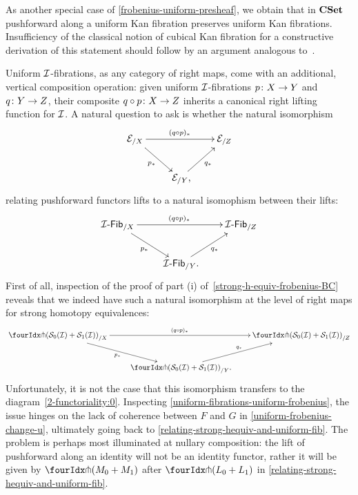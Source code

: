 \documentclass[reqno,10pt,a4paper,oneside,draft]{amsart}
\begin{document}
\begin{example}
As another special case of \cref{frobenius-uniform-presheaf}, we obtain that in $\CSet$ pushforward along a uniform Kan fibration preserves uniform Kan fibrations.
Insufficiency of the classical notion of cubical Kan fibration for a constructive derivation of this statement should follow by an argument analogous to~\cite{coquand-non-constructivity-kan}.
\end{example}

\begin{remark}[2-functoriality]
Uniform $\cal{I}$-fibrations, as any category of right maps, come with an additional, vertical composition operation: given uniform $\cal{I}$-fibrations $p \co X \to Y$ and $q \co Y \to Z$, their composite $q \cc p \co X \to Z$ inherits a canonical right lifting function for $\cal{I}$.
A natural question to ask is whether the natural isomorphism
\[
\xymatrix{
  \catE_{/X}
  \ar[dr]_{p_*}
  \ar[rr]^{(q \cc p)_*}
&&
  \catE_{/Z}
\\&
  \catE_{/Y}
  \ar[ur]_{q_*}
\rlap{,}}
\]
relating pushforward functors lifts to a natural isomophism between their lifts:
\begin{equation} \label{2-functoriality:0}
\xycenter{
  \Fib[\cal{I}]_{/X}
  \ar[dr]_{p_*}
  \ar[rr]^{(q \cc p)_*}
&&
  \Fib[\cal{I}]_{/Z}
\\&
  \Fib[\cal{I}]_{/Y}
  \ar[ur]_{q_*}
\rlap{.}}
\end{equation}
First of all, inspection of the proof of part (i) of~\cref{strong-h-equiv-frobenius-BC} reveals that we indeed have such a natural isomorphism at the level of right maps for strong homotopy equivalences:
\[
\xymatrix{
  \liftr{(\cal{S}_0(\cal{I}) + \cal{S}_1(\cal{I}))}_{/X}
  \ar[dr]_{p_*}
  \ar[rr]^{(q \cc p)_*}
&&
  \liftr{(\cal{S}_0(\cal{I}) + \cal{S}_1(\cal{I}))}_{/Z}
\\&
  \liftr{(\cal{S}_0(\cal{I}) + \cal{S}_1(\cal{I}))}_{/Y}
  \ar[ur]^{q_*}
\rlap{.}}
\]
Unfortunately, it is not the case that this isomorphism transfers to the diagram~\eqref{2-functoriality:0}.
Inspecting \cref{uniform-fibrations-uniform-frobenius}, the issue hinges on the lack of coherence between $F$ and $G$ in \cref{uniform-frobenius-change-u}, ultimately going back to \cref{relating-strong-hequiv-and-uniform-fib}.
The problem is perhaps most illuminated at nullary composition: the lift of pushforward along an identity will not be an identity functor, rather it will be given by $\liftr{(M_0 + M_1)}$ after $\liftr{(L_0 + L_1)}$ in \cref{relating-strong-hequiv-and-uniform-fib}.


\end{remark}
\end{document}
